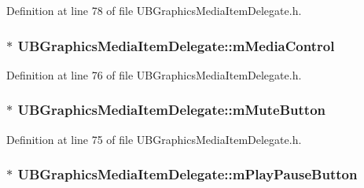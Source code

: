 Definition at line 78 of file U\-B\-Graphics\-Media\-Item\-Delegate.\-h.

\hypertarget{class_u_b_graphics_media_item_delegate_a68cba7dc02297fe37d7c0f8ace77b280}{
\subsubsection[{m\-Media\-Control}]{$\ast$ U\-B\-Graphics\-Media\-Item\-Delegate\-::m\-Media\-Control\hspace{0.3cm}{\ttfamily [protected]}}}\label{df/dfb/class_u_b_graphics_media_item_delegate_a68cba7dc02297fe37d7c0f8ace77b280}


Definition at line 76 of file U\-B\-Graphics\-Media\-Item\-Delegate.\-h.

\hypertarget{class_u_b_graphics_media_item_delegate_af04cff1ac6ce4dea0ac103c95f740007}{
\subsubsection[{m\-Mute\-Button}]{$\ast$ U\-B\-Graphics\-Media\-Item\-Delegate\-::m\-Mute\-Button\hspace{0.3cm}{\ttfamily [protected]}}}\label{df/dfb/class_u_b_graphics_media_item_delegate_af04cff1ac6ce4dea0ac103c95f740007}


Definition at line 75 of file U\-B\-Graphics\-Media\-Item\-Delegate.\-h.

\hypertarget{class_u_b_graphics_media_item_delegate_a10af235b512235a940a35b4b2988cde5}{
\subsubsection[{m\-Play\-Pause\-Button}]{$\ast$ U\-B\-Graphics\-Media\-Item\-Delegate\-::m\-Play\-Pause\-Button\hspace{0.3cm}{\ttfamily [protected]}}}\label{df/dfb/class_u_b_graphics_media_item_delegate_a10af235b512235a940a35b4b2988cde5}


